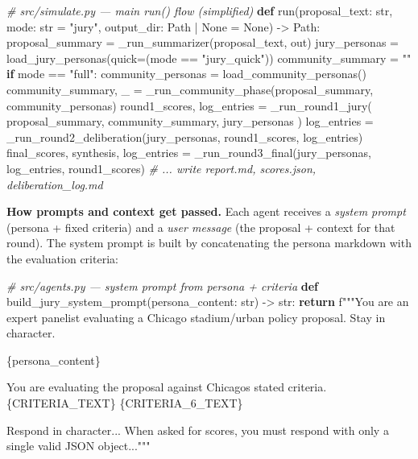 \documentclass[
  11pt,
]{article}
\newenvironment{Shaded}{}{}
\newcommand{\BuiltInTok}[1]{\textcolor[rgb]{0.00,0.50,0.00}{#1}}
\newcommand{\CommentTok}[1]{\textcolor[rgb]{0.38,0.63,0.69}{\textit{#1}}}
\newcommand{\ControlFlowTok}[1]{\textcolor[rgb]{0.00,0.44,0.13}{\textbf{#1}}}
\newcommand{\KeywordTok}[1]{\textcolor[rgb]{0.00,0.44,0.13}{\textbf{#1}}}
\newcommand{\NormalTok}[1]{#1}
\newcommand{\OperatorTok}[1]{\textcolor[rgb]{0.40,0.40,0.40}{#1}}
\newcommand{\SpecialCharTok}[1]{\textcolor[rgb]{0.25,0.44,0.63}{#1}}
\newcommand{\SpecialStringTok}[1]{\textcolor[rgb]{0.73,0.40,0.53}{#1}}
\newcommand{\StringTok}[1]{\textcolor[rgb]{0.25,0.44,0.63}{#1}}
\newcommand{\VariableTok}[1]{\textcolor[rgb]{0.10,0.09,0.49}{#1}}
\begin{document}
\begin{Shaded}
\begin{Highlighting}[]
\CommentTok{\# src/simulate.py — main run() flow (simplified)}
\KeywordTok{def}\NormalTok{ run(proposal\_text: }\BuiltInTok{str}\NormalTok{, mode: }\BuiltInTok{str} \OperatorTok{=} \StringTok{"jury"}\NormalTok{, output\_dir: Path }\OperatorTok{|} \VariableTok{None} \OperatorTok{=} \VariableTok{None}\NormalTok{) }\OperatorTok{{-}\textgreater{}}\NormalTok{ Path:}
\NormalTok{    proposal\_summary }\OperatorTok{=}\NormalTok{ \_run\_summarizer(proposal\_text, out)}
\NormalTok{    jury\_personas }\OperatorTok{=}\NormalTok{ load\_jury\_personas(quick}\OperatorTok{=}\NormalTok{(mode }\OperatorTok{==} \StringTok{"jury\_quick"}\NormalTok{))}
\NormalTok{    community\_summary }\OperatorTok{=} \StringTok{""}
    \ControlFlowTok{if}\NormalTok{ mode }\OperatorTok{==} \StringTok{"full"}\NormalTok{:}
\NormalTok{        community\_personas }\OperatorTok{=}\NormalTok{ load\_community\_personas()}
\NormalTok{        community\_summary, \_ }\OperatorTok{=}\NormalTok{ \_run\_community\_phase(proposal\_summary, community\_personas)}
\NormalTok{    round1\_scores, log\_entries }\OperatorTok{=}\NormalTok{ \_run\_round1\_jury(}
\NormalTok{        proposal\_summary, community\_summary, jury\_personas}
\NormalTok{    )}
\NormalTok{    log\_entries }\OperatorTok{=}\NormalTok{ \_run\_round2\_deliberation(jury\_personas, round1\_scores, log\_entries)}
\NormalTok{    final\_scores, synthesis, log\_entries }\OperatorTok{=}\NormalTok{ \_run\_round3\_final(jury\_personas, log\_entries, round1\_scores)}
    \CommentTok{\# ... write report.md, scores.json, deliberation\_log.md}
\end{Highlighting}
\end{Shaded}

\textbf{How prompts and context get passed.} Each agent receives a
\emph{system prompt} (persona + fixed criteria) and a \emph{user
message} (the proposal + context for that round). The system prompt is
built by concatenating the persona markdown with the evaluation
criteria:

\begin{Shaded}
\begin{Highlighting}[]
\CommentTok{\# src/agents.py — system prompt from persona + criteria}
\KeywordTok{def}\NormalTok{ build\_jury\_system\_prompt(persona\_content: }\BuiltInTok{str}\NormalTok{) }\OperatorTok{{-}\textgreater{}} \BuiltInTok{str}\NormalTok{:}
    \ControlFlowTok{return} \SpecialStringTok{f"""You are an expert panelist evaluating a Chicago stadium/urban policy proposal. Stay in character.}

\SpecialCharTok{\{}\NormalTok{persona\_content}\SpecialCharTok{\}}

\SpecialStringTok{You are evaluating the proposal against Chicago\textquotesingle{}s stated criteria. }\SpecialCharTok{\{}\NormalTok{CRITERIA\_TEXT}\SpecialCharTok{\}}
\SpecialCharTok{\{}\NormalTok{CRITERIA\_6\_TEXT}\SpecialCharTok{\}}

\SpecialStringTok{Respond in character... When asked for scores, you must respond with only a single valid JSON object..."""}
\end{Highlighting}
\end{Shaded}
\end{document}
